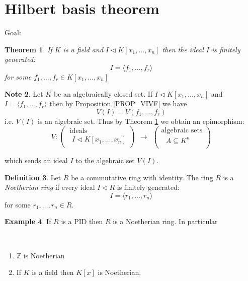 \documentclass[12pt, letterpaper, oneside]{article}
\theoremstyle{plain}
\newtheorem{theorem}{Theorem}[section]
\theoremstyle{definition}
\newtheorem{definition}[theorem]{Definition}
\newtheorem{example}[theorem]{Example}
\newtheorem{note}[theorem]{Note}
\newcommand{\lra}{\longrightarrow}
\newcommand{\Z}{{\mathbb Z}}
\newcommand{\subgp}[1]{\langle#1\rangle}
\newcommand{\benu}{\begin{enumerate}}
\newcommand{\eenu}{\end{enumerate}}
\newcommand{\vs}{\vskip 5mm}
\newcommand{\isep}[1][0]{\setlength{\itemsep}{#1 mm}}
\begin{document}


\newpage
\section{Hilbert basis theorem}
\label{SEC_HILBBASTHM}


Goal:

\begin{theorem}
\label{POLYRINGISNOETH}
If $K$ is a field and $I\lhd K[x_{1}, \dots, x_{n}]$ then the ideal $I$ is finitely generated:
$$I = \subgp{f_{1}, \dots, f_{r}}$$
for some $f_{1}, \dots, f_{r}\in K[x_{1}, \dots, x_{n}]$
\end{theorem}

\vs\vs

\begin{note}
Let $K$ be an algebraically closed set. If $I\lhd K[x_{1}, \dots, x_{n}]$ and 
$I = \subgp{f_{1}, \dots, f_{r}}$ then  by Proposition \ref{PROP_VIVF} we have 
$$V(I) = V(f_{1}, \dots, f_{r})$$
i.e. $V(I)$ is an algebraic set. Thus by Theorem \ref{POLYRINGISNOETH} we obtain an 
epimorphism: 
$$
V\colon
\begin{pmatrix}
\text{ ideals} \\[1mm]
\text{  $I\lhd  K[x_{1}, \dots, x_{n}]$} \\
\end{pmatrix}
\ \ \lra \ \ 
\begin{pmatrix}
\text{algebraic sets} \\[1mm]
\text{ $A\subseteq K^{n}$} \\
\end{pmatrix}
$$
\end{note}
which sends an ideal $I$ to the algebraic set  $V(I)$. 


\vs\vs


\begin{definition}
Let $R$ be a commutative ring with identity. The ring $R$ is a \emph{Noetherian ring} 
if every ideal  $I\lhd R$ is finitely generated:
$$I = \subgp{r_{1}, \dots, r_{n}}$$
for some $r_{1}, \dots, r_{n}\in R$. 
\end{definition}

\vs\vs

\begin{example} If $R$ is a PID then $R$ is a Noetherian ring. In particular 

\vskip -13mm

\ 
\benu
\isep[0]
\item $\Z$ is Noetherian 
\item If $K$ is a field then $K[x]$ is Noetherian. 
\eenu
\end{example} 
\end{document}
